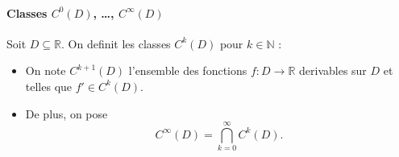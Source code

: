 \paragraph{Classes $C^{0}(D)$, \dots, $C^{\infty}(D)$}
\begin{definition}
Soit $D\subseteq \mathbb{R}$. On definit les classes $C^{k}(D)$ pour $k\in \mathbb{N}$ :
\begin{itemize}
\item On note $C^{k+1}(D)$ l'ensemble des fonctions $f:D\to \mathbb{R}$ derivables sur $D$ et telles que $f'\in C^{k}(D)$.
\item De plus, on pose
$$
C^{\infty}(D)=\bigcap _{k=0}^{\infty} C^{k}(D).
$$
\end{itemize}
\end{definition}
